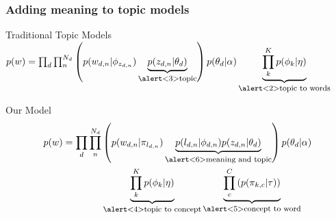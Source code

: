 \documentclass[compress]{beamer}
\newcommand{\explain}[2]{\underbrace{#2}_{\mbox{\footnotesize{#1}}}}
\begin{document}
\begin{frame}
  \frametitle{Adding meaning to topic models}
        \begin{block}{Traditional Topic Models}
                $ p(w) = \prod_d \prod_n^{N_d} \left( p(w_{d,n} | \phi_{z_{d,n}})
                  \explain{\alert<3>{topic}}{p(z_{d,n} | \theta_d)} \right) p(\theta_d | \alpha)                 \explain{\alert<2>{topic to words}}{ \prod_k^K
p(\phi_k | \eta) }$
        \end{block}

        \begin{block}{Our Model}
          \vspace{-0.8cm}
          \begin{align*}
               p(w) = \prod_d \prod_n^{N_d} & \left( p(w_{d,n} | \pi_{l_{d,n}})
                 \explain{\alert<6>{meaning and topic}} {p(l_{d,n} | \phi_{d,n} )
                   p(z_{d,n} | \theta_d)}  \right) p(\theta_d | \alpha) \\
               &  \explain{\alert<4>{topic to concept}}{\prod_k^K
                p(\phi_k | \eta)} \explain{\alert<5>{concept to word}}{\prod_c^C \left(
                  p(\pi_{k,c} | \tau) \right) }
           \end{align*}
        \end{block}


\end{frame}
\end{document}
